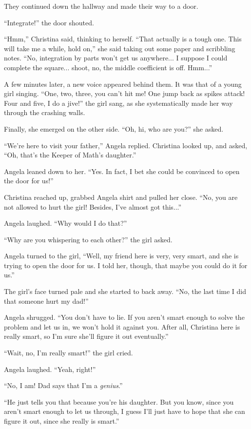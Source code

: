 \documentclass[showtrims,b6paper,draft,10pt]{memoir}
\begin{document}
They continued down the hallway and made their way to a door.

``Integrate!'' the door shouted.

``Hmm,'' Christina said, thinking to herself.  ``That actually is a tough one.  This will take me a while, hold on,'' she said taking out some paper and scribbling notes.  ``No, integration by parts won't get us anywhere... I suppose I could complete the square... shoot, no, the middle coefficient is off.  Hmm...''

A few minutes later, a new voice appeared behind them.  It was that of a young girl singing.  ``One, two, three, you can't hit me!  One jump back as spikes attack!  Four and five, I do a jive!'' the girl sang, as she systematically made her way through the crashing walls.

Finally, she emerged on the other side.  ``Oh, hi, who are you?'' she asked.

``We're here to visit your father,'' Angela replied.  Christina looked up, and asked,  ``Oh, that's the Keeper of Math's daughter.''

Angela leaned down to her.  ``Yes.  In fact, I bet she could be convinced to open the door for us!''

Christina reached up, grabbed Angela shirt and pulled her close.  ``No, you are not allowed to hurt the girl! Besides, I've almost got this...''

Angela laughed.  ``Why would I do that?''

``Why are you whispering to each other?'' the girl asked.

Angela turned to the girl, ``Well, my friend here is very, very smart, and she is trying to open the door for us.  I told her, though, that maybe you could do it for us.''

The girl's face turned pale and she started to back away.  ``No,  the last time I did that someone hurt my dad!''

Angela shrugged.  ``You don't have to lie.  If you aren't smart enough to solve the problem and let us in, we won't hold it against you.  After all, Christina here is really smart, so I'm sure she'll figure it out eventually.''

``Wait, no, I'm really smart!'' the girl cried.

Angela laughed.  ``Yeah, right!''

``No, I am!  Dad says that I'm a \emph{genius}.''

``He just tells you that because you're his daughter.  But you know, since you aren't smart enough to let us through, I guess I'll just have to hope that she can figure it out, since she really is smart.''
\end{document}
